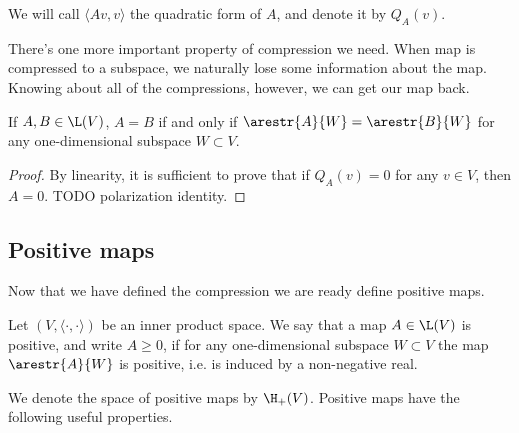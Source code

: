 We will call $\langle A v, v \rangle$ the quadratic form of $A$, and denote it by $Q_{A}(v)$.

There's one more important property of compression we need. When map is compressed to a subspace, we naturally lose some information about the map. Knowing about all of the compressions, however, we can get our map back.

\begin{lem}
	If $A, B \in \L(V)$, $A = B$ if and only if $\arestr{A}{W} = \arestr{B}{W}$ for any one-dimensional subspace $W \subset V$.
\end{lem} 
\begin{proof}
	By linearity, it is sufficient to prove that if $Q_{A}(v) = 0$ for any $v \in V$, then $A = 0$. TODO polarization identity.
\end{proof}

\subsection{Positive maps}

Now that we have defined the compression we are ready define positive maps.

\begin{maar}
	Let $(V, \langle \cdot, \cdot \rangle)$ be an inner product space. We say that a map $A \in \L(V)$ is positive, and write $A \geq 0$, if for any one-dimensional subspace $W \subset V$ the map $\arestr{A}{W}$ is positive, i.e. is induced by a non-negative real.
\end{maar}

We denote the space of positive maps by $\H_{+}(V)$. Positive maps have the following useful properties.

